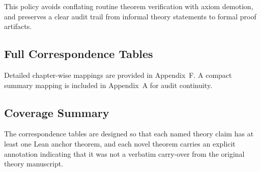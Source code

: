This policy avoids conflating routine theorem verification with axiom demotion,
and preserves a clear audit trail from informal theory statements to formal proof
artifacts.

\subsection{Full Correspondence Tables}

Detailed chapter-wise mappings are provided in Appendix~F. A compact summary mapping is included in Appendix~A for audit continuity.

\subsection{Coverage Summary}

The correspondence tables are designed so that each named theory claim has at
least one Lean anchor theorem, and each novel theorem carries an explicit
annotation indicating that it was not a verbatim carry-over from the original
theory manuscript.
